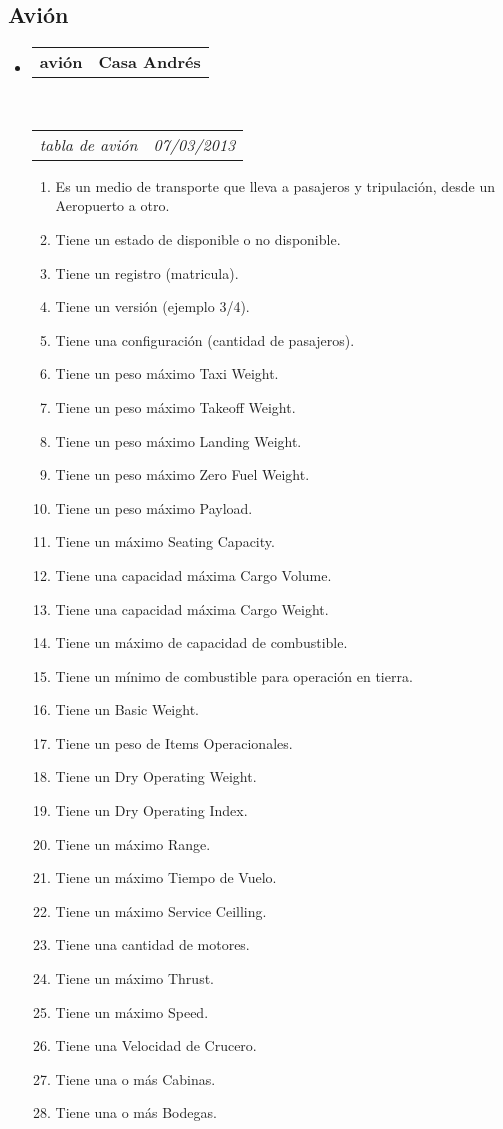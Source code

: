 \documentclass[10pt,letterpaper]{article}
\makeatletter
\newcommand{\headerrow}[2]
{\begin{tabular*}{\linewidth}{l@{\extracolsep{\fill}}r}
	#1 &
	#2 \\
\end{tabular*}}
\makeatother
\begin{document}
\subsection*{Avión}

\begin{itemize}
	\parskip=0.1em

	\item
	\headerrow
		{\textbf{avión}}
		{\textbf{Casa Andrés}}
	\\
	\headerrow
		{\emph{tabla de avión}}
		{\emph{07/03/2013}}
	\begin{enumerate}
		\item Es un medio de transporte que lleva a pasajeros y tripulación, desde un Aeropuerto a otro.
		\item Tiene un estado de disponible o no disponible.
		\item Tiene un registro (matricula).
		\item Tiene un versión (ejemplo 3/4).
		\item Tiene una configuración (cantidad de pasajeros).
		\item Tiene un peso máximo Taxi Weight.
		\item Tiene un peso máximo Takeoff Weight.
		\item Tiene un peso máximo Landing Weight.
		\item Tiene un peso máximo Zero Fuel Weight.
		\item Tiene un peso máximo Payload.
		\item Tiene un máximo Seating Capacity.
		\item Tiene una capacidad máxima Cargo Volume.
		\item Tiene una capacidad máxima Cargo Weight.
		\item Tiene un máximo de capacidad de combustible.
		\item Tiene un mínimo de combustible para operación en tierra.
		\item Tiene un Basic Weight.
		\item Tiene un peso de Items Operacionales.
		\item Tiene un Dry Operating Weight.		
		\item Tiene un Dry Operating Index.
		\item Tiene un máximo Range.
		\item Tiene un máximo Tiempo de Vuelo.
		\item Tiene un máximo Service Ceilling.
		\item Tiene una cantidad de motores.
		\item Tiene un máximo Thrust.		
		\item Tiene un máximo Speed.
		\item Tiene una Velocidad de Crucero.
		\item Tiene una o más Cabinas.
		\item Tiene una o más Bodegas.
		
	\end{enumerate}

\end{itemize}
\end{document}
